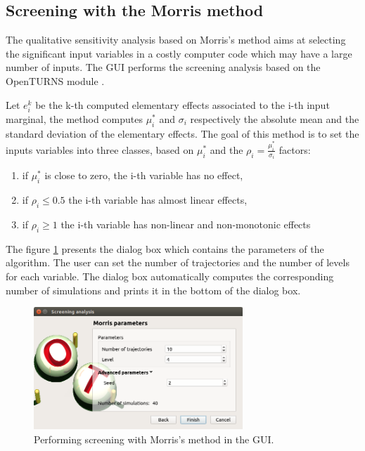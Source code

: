 \documentclass{article}
\begin{document}
\subsection{Screening with the Morris method}

The qualitative sensitivity analysis based on Morris's method \cite{Morris1991} aims at 
selecting the significant input variables in a costly computer code which may have 
a large number of inputs. 
The GUI performs the screening analysis based on the OpenTURNS  module \cite{otmorris}. 

Let $e_i^k$ be the k-th computed elementary effects associated to the i-th input marginal, 
the method computes $\mu_i^*$ and $\sigma_i$ respectively the absolute mean and the standard deviation of the elementary effects. 
The goal of this method is to set the inputs variables into three classes, based on $\mu_i^*$ 
and the $\rho_i = \frac{\mu_i^*}{\sigma_i}$ factors:
\begin{enumerate}
\item if $\mu_i^*$ is close to zero, the i-th variable has no effect,
\item if $\rho_i \leq 0.5$ the i-th variable has almost linear effects,
\item if $\rho_i \geq 1$ the i-th variable has non-linear and non-monotonic effects
\end{enumerate}

The figure \ref{fig-morris} presents the dialog box which contains the parameters of the 
algorithm. 
The user can set the number of trajectories and the number of levels for each variable. 
The dialog box automatically computes the corresponding number of simulations and prints 
it in the bottom of the dialog box. 

\begin{figure}
\centering
\includegraphics[width=0.7\textwidth]{figures/morris_wizard_3rd_page.png}
\caption{Performing screening with Morris's method in the GUI.}
\label{fig-morris}
\end{figure}
\end{document}
